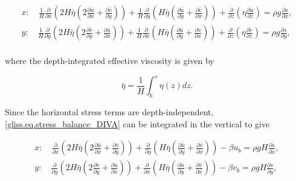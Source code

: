 {\begin{equation}
  \label{gliss.eq.stress_balance_DIVA}
  \begin{split}
    x: \quad \frac{1}{H} \frac{\partial }{\partial x}\left( 2H \bar{\eta} \left(2\frac{\partial \bar{u}}{\partial x} + \frac{\partial \bar{v}}{\partial y} \right) \right) 
           + \frac{1}{H} \frac{\partial }{\partial y}\left(  H \bar{\eta} \left( \frac{\partial \bar{u}}{\partial y} + \frac{\partial \bar{v}}{\partial x} \right) \right) 
           +\frac{\partial }{\partial z}\left( \eta \frac{\partial u}{\partial z} \right) 
           = \rho g\frac{\partial s}{\partial x}, \\
    y: \quad \frac{1}{H} \frac{\partial }{\partial y}\left( 2H \bar{\eta} \left(2\frac{\partial \bar{v}}{\partial y} + \frac{\partial \bar{u}}{\partial x} \right) \right) 
           + \frac{1}{H} \frac{\partial }{\partial x}\left(  H \bar{\eta} \left( \frac{\partial \bar{u}}{\partial y} + \frac{\partial \bar{v}}{\partial x} \right) \right) 
           + \frac{\partial }{\partial z}\left( \eta \frac{\partial v}{\partial z} \right) 
           = \rho g\frac{\partial s}{\partial y},  \\
  \end{split}
\end{equation}

\noindent
where the depth-integrated effective viscosity is given by

\begin{equation}
  \label{gliss.eq.effective_viscosity_vertint}
  \bar{\eta} = \frac{1}{H}\int_{b}^{s}{\eta(z)dz}.
\end{equation}

\noindent
Since the horizontal stress terms are depth-independent,
\eqref{gliss.eq.stress_balance_DIVA} can be integrated in the vertical to give

\begin{equation}
  \label{gliss.eq.stress_balance_DIVA_vertint}
  \begin{split}
    x: \quad \frac{\partial }{\partial x}\left( 2H \bar{\eta} \left(2\frac{\partial \bar{u}}{\partial x} + \frac{\partial \bar{v}}{\partial y} \right) \right) 
           + \frac{\partial }{\partial y}\left(  H \bar{\eta} \left( \frac{\partial \bar{u}}{\partial y} + \frac{\partial \bar{v}}{\partial x} \right) \right) 
           - \beta u_b
           = \rho gH \frac{\partial s}{\partial x}, \\
    y: \quad \frac{\partial }{\partial y}\left( 2H \bar{\eta} \left(2\frac{\partial \bar{v}}{\partial y} + \frac{\partial \bar{u}}{\partial x} \right) \right) 
           + \frac{\partial }{\partial x}\left(  H \bar{\eta} \left( \frac{\partial \bar{u}}{\partial y} + \frac{\partial \bar{v}}{\partial x} \right) \right) 
           - \beta v_b
           = \rho gH \frac{\partial s}{\partial y},  \\
  \end{split}
\end{equation}

}
